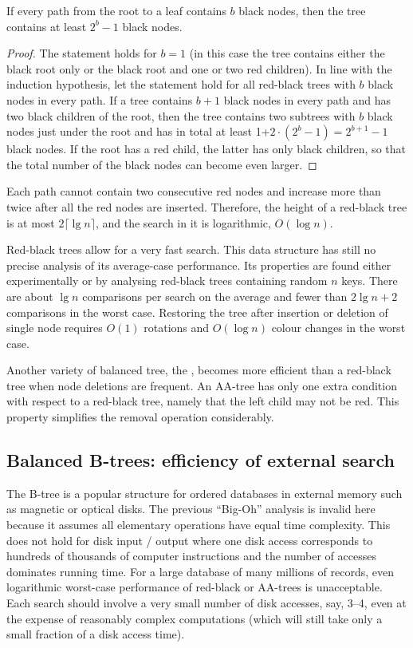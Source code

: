 \begin{Theorem}
If every path from the root to a leaf contains $b$ black 
nodes, then the tree contains at least $2^{b}-1$ black nodes.
\end{Theorem}
\begin{proof}

The statement holds for $b=1$ (in this case
the tree contains either the black root only or the black
root and one or two red children). In line with the induction hypothesis, 
let the statement hold for all red-black trees with $b$ black nodes  in every 
path. If a tree contains $b+1$ black nodes in every path and has two black 
children of the root, then the tree contains two subtrees with $b$ black nodes 
just under the root and has in total at least 1+$2 \cdot(2^{b}-1) = 2^{b+1}-1$ 
black nodes. If the root has a red child, the latter has only black children, 
so that the total number of the black nodes can become even larger. 
\end{proof}

Each path cannot contain two consecutive red nodes and increase more
than twice after all the red nodes are inserted. Therefore, the height
of a red-black tree is at most $2\lceil \lg n \rceil$, and the
search in it is logarithmic, $O(\log n)$.

Red-black trees allow for a very fast search. This data structure has
still no precise analysis of its average-case performance. Its
properties are found either experimentally or by analysing red-black
trees containing random $n$ keys. There are about $\lg n$ comparisons per search 
on the average and fewer than $2\lg n + 2$ comparisons in the
worst case. Restoring the tree after insertion or deletion of single node 
requires $O(1)$ rotations and $O(\log n)$ colour changes in the worst case.

Another variety of balanced tree, the , becomes more efficient 
than a red-black tree when node deletions are frequent. An AA-tree has 
only one extra condition with respect to a red-black tree, namely that 
the left child may not be red. This property simplifies the removal 
operation considerably.

\subsection{Balanced B-trees: efficiency of external search}
\label{ss:B-tree}

The B-tree is a popular
structure for ordered databases in external memory such as magnetic or
optical disks. The previous ``Big-Oh'' analysis is invalid here because
it assumes all elementary operations have equal time complexity. This
does not hold for disk input / output where one disk access corresponds
to hundreds of thousands of computer instructions and the number of
accesses dominates running time. For a large database of many millions
of records, even logarithmic worst-case performance of red-black or
AA-trees is unacceptable. Each search should involve a very small number
of disk accesses, say, 3--4, even at the expense of reasonably
complex computations (which will still take only a small fraction of a disk access time).

